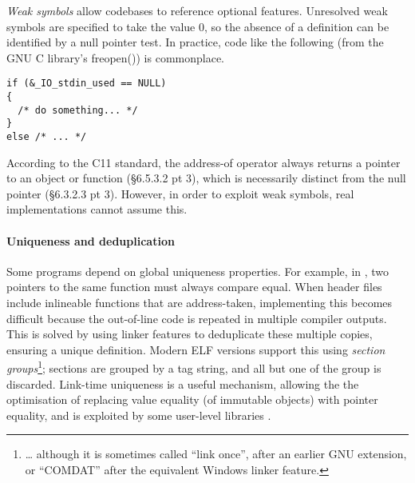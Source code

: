 \emph{Weak symbols} allow codebases to reference optional features. 
Unresolved weak symbols are specified to take the value 0, so 
the absence of a definition can be identified by a null pointer test.
In practice, code like the following (from the GNU C library's 
\textsf{freopen()}) is commonplace.

{\scriptsize\begin{lstlisting}
if (&_IO_stdin_used == NULL)
{
  /* do something... */
}
else /* ... */
\end{lstlisting}}

According to the C11 standard, the address-of operator 
always returns a pointer to an object or function
(\S 6.5.3.2 pt 3), which is necessarily distinct from the null pointer
(\S6.3.2.3 pt 3).
However, in order to exploit weak symbols, real implementations
cannot assume this.

% 

\paragraph{Uniqueness and deduplication}
Some programs depend on global uniqueness properties. 
For example, in \Cplusplus{}, two pointers to the same function
must always compare equal.
When header files include inlineable functions that are address-taken, 
implementing this becomes difficult because the
out-of-line code is repeated in multiple compiler outputs.
This is solved by using linker features 
to deduplicate these multiple copies, ensuring a unique definition.
Modern ELF versions support this using \emph{section groups}\footnote{\ldots{} although it is sometimes called ``link once'', after an earlier GNU extension, or
``COMDAT'' after the equivalent Windows linker feature.}; 
sections are grouped by a tag string, and all but one of the group is discarded.
Link-time uniqueness is a useful mechanism, allowing the 
the optimisation of replacing value equality (of immutable objects) with pointer equality,
and is exploited by some user-level libraries \citep{kell_towards_2015}.

